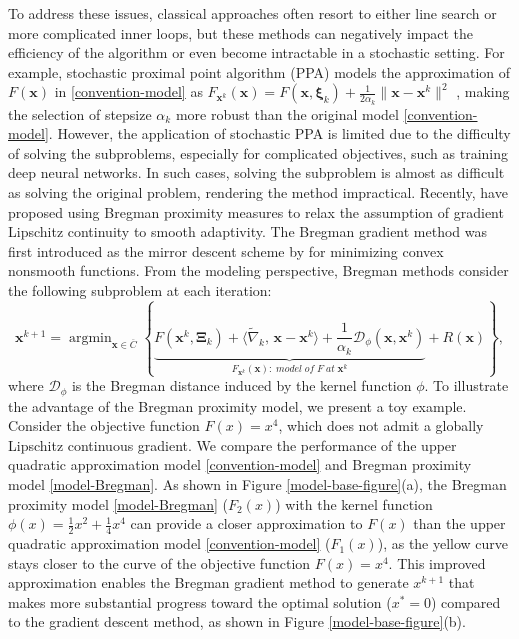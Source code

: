 \documentclass[twoside,11pt]{article}
\newcommand{\cD}{\mathcal D}
\DeclareMathOperator*{\argmin}{argmin}
\def\inprod#1#2{\langle#1,\,#2\rangle}
\def\vx{{\bm{x}}}
\begin{document}
To address these issues, classical approaches often resort to either line search or more complicated inner loops, but these methods can negatively impact the efficiency of the algorithm or even become intractable in a stochastic setting. For example, stochastic proximal point algorithm (PPA) models the approximation of $F(\vx)$ in \eqref{convention-model} as $F_{{\vx^k}}(\vx)=F(\vx,{\bm\xi}_k)+\frac{1}{2\alpha_k}\|\vx-{\vx^k}\|^2$ \citep{bertsekas2011incremental,bianchi2016ergodic,patrascu2017nonasymptotic,rockafellar1976monotone}, making the selection of stepsize $\alpha_k$ more robust than the original model \eqref{convention-model}. However, the application of stochastic PPA is limited due to the difficulty of solving the subproblems, especially for complicated objectives, such as training deep neural networks. In such cases, solving the subproblem is almost as difficult as solving the original problem, rendering the method impractical. Recently, \citet{bauschke2017descent,lu2018relatively} have proposed using Bregman proximity measures to relax the assumption of gradient Lipschitz continuity to smooth adaptivity. The Bregman gradient method was first introduced as the mirror descent scheme by \citet{nemirovskij1983problem} for minimizing convex nonsmooth functions. From the modeling perspective, Bregman methods consider the following subproblem at each iteration:
\begin{equation}
{\vx^{k+1}}=\argmin_{\vx\in \overline{C}}\left\{\underbrace{F({\vx^k},{\bm\Xi}_{k})+\inprod{\widetilde\nabla_k}{\vx-{\vx^k}}+\frac{1}{\alpha_k}\cD_\phi(\vx,{\vx^k})}_{F_{{\vx^k}}(\vx):\;model\;of\;F\;at\;{\vx^k}}+R(\vx)\right\},
\label{model-Bregman}
\end{equation}
where $\cD_\phi$ is the Bregman distance induced by the kernel function $\phi$. To illustrate the advantage of the Bregman proximity model, we present a toy example. Consider the objective function $F(x)=x^4$, which does not admit a globally Lipschitz continuous gradient. We compare the performance of the upper quadratic approximation model \eqref{convention-model} and Bregman proximity model \eqref{model-Bregman}. As shown in Figure \eqref{model-base-figure}(a), the Bregman proximity model \eqref{model-Bregman} ($F_2(x)$) with the kernel function $\phi(x)=\frac{1}{2}x^2+\frac{1}{4}x^4$ can provide a closer approximation to $F(x)$ than the upper quadratic approximation model \ref{convention-model} ($F_1(x)$), as the yellow curve stays closer to the curve of the objective function $F(x)=x^4$. This improved approximation enables the Bregman gradient method to generate ${x^{k+1}}$ that makes more substantial progress toward the optimal solution ($x^*=0$) compared to the gradient descent method, as shown in Figure \ref{model-base-figure}(b).
\end{document}
